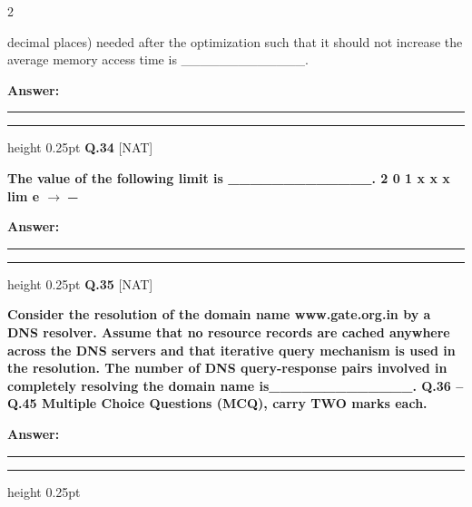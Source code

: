 \documentclass[a4paper,10pt,twoside]{article}
\begin{document}
\begin{multicols}{2}
{decimal places) needed after the optimization such that it should not increase the
average memory access time is \_\_\_\_\_\_\_\_\_\_\_\_\_. \par}
\par\vspace{3pt}\noindent\textbf{Answer:} \rule{3.2cm}{0.4pt}
\par\vspace{6pt}\hrule height 0.25pt\vspace{6pt}
\noindent\textbf{Q.34} \hfill {\footnotesize\textsf{[NAT]}}
\par\vspace{2pt}
{\bfseries The value of the following limit is \_\_\_\_\_\_\_\_\_\_\_\_\_.
2
0 1
x
x
x
lim
e
$\to$− \par}
\par\vspace{3pt}\noindent\textbf{Answer:} \rule{3.2cm}{0.4pt}
\par\vspace{6pt}\hrule height 0.25pt\vspace{6pt}
\noindent\textbf{Q.35} \hfill {\footnotesize\textsf{[NAT]}}
\par\vspace{2pt}
{\bfseries Consider the resolution of the domain name www.gate.org.in by a DNS
resolver. Assume that no resource records are cached anywhere across the DNS
servers and that iterative query mechanism is used in the resolution. The number
of DNS query-response pairs involved in completely resolving the domain name
is\_\_\_\_\_\_\_\_\_\_\_\_\_.
Q.36 -- Q.45 Multiple Choice Questions (MCQ), carry TWO marks each. \par}
\par\vspace{3pt}\noindent\textbf{Answer:} \rule{3.2cm}{0.4pt}
\par\vspace{6pt}\hrule height 0.25pt\vspace{6pt}

\vspace{6pt}
\vspace{3pt}


\end{multicols}
\end{document}
